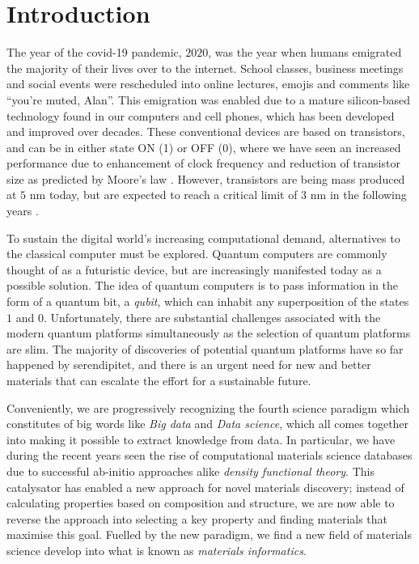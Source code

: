 \chapter{Introduction}

The year of the covid-19 pandemic, $2020$, was the year when humans emigrated the majority of their lives over to the internet. School classes, business meetings and social events were rescheduled into online lectures, emojis and comments like ``you're muted, Alan''. This emigration was enabled due to a mature silicon-based technology found in our computers and cell phones, which has been developed and improved over decades. These conventional devices are based on transistors, and can be in either state ON (1) or OFF (0), where we have seen an increased performance due to enhancement of clock frequency and reduction of transistor size as predicted by Moore's law \cite{Moore1965, Pavicic2006}. However, transistors are being mass produced at $5$ nm today, but are expected to reach a critical limit of $3$ nm in the following years \cite{Gwennap2020}.



To sustain the digital world's increasing computational demand, alternatives to the classical computer must be explored. Quantum computers are commonly thought of as a futuristic device, but are increasingly manifested today as a possible solution. The idea of quantum computers is to pass information in the form of a quantum bit, a \textit{qubit}, which can inhabit any superposition of the states $1$ and $0$. Unfortunately, there are substantial challenges associated with the modern quantum platforms simultaneously as the selection of quantum platforms are slim. The majority of discoveries of potential quantum platforms have so far happened by serendipitet, and there is an urgent need for new and better materials that can escalate the effort for a sustainable future.

Conveniently, we are progressively recognizing the fourth science paradigm which constitutes of big words like \textit{Big data} and \textit{Data science}, which all comes together into making it possible to extract knowledge from data. In particular, we have during the recent years seen the rise of computational materials science databases due to successful ab-initio approaches alike \textit{density functional theory}. This catalysator has enabled a new approach for novel materials discovery; instead of calculating properties based on composition and structure, we are now able to reverse the approach into selecting a key property and finding materials that maximise this goal. Fuelled by the new paradigm, we find a new field of materials science develop into what is known as \textit{materials informatics}.

